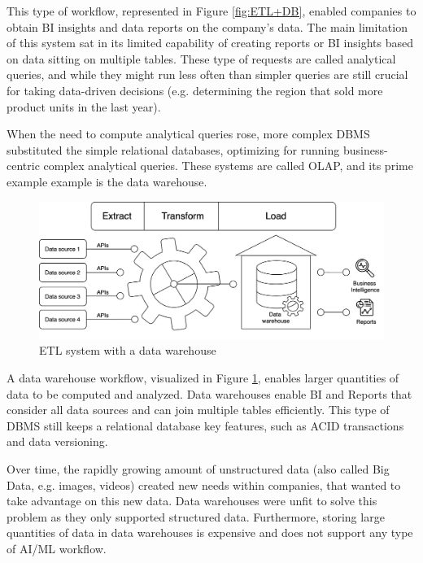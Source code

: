 This type of workflow, represented in Figure \ref{fig:ETL+DB}, enabled companies to obtain \gls{BI} insights and data reports on the company's data. The main limitation of this system sat in its limited capability of creating reports or \gls{BI} insights based on data sitting on multiple tables. These type of requests are called analytical queries, and while they might run less often than simpler queries are still crucial for taking data-driven decisions (e.g. determining the region that sold more product units in the last year).

When the need to compute analytical queries rose, more complex \gls{DBMS} substituted the simple relational databases, optimizing for running business-centric complex analytical queries. These systems are called \gls{OLAP}, and its prime example example is the data warehouse.

\begin{figure}[!ht]
    \begin{center}
      \includegraphics[width=\textwidth]{figures/2-background/DeltaLake_evolution-ETL+DW.png}
    \end{center}
    \caption{\gls{ETL} system with a data warehouse}
    \label{fig:ETL+DW}
\end{figure}

A data warehouse workflow, visualized in Figure \ref{fig:ETL+DW}, enables larger quantities of data to be computed and analyzed. Data warehouses enable \gls{BI} and Reports that consider all data sources and can join multiple tables efficiently. This type of \gls{DBMS} still keeps a relational database key features, such as \gls{ACID} transactions and data versioning.

Over time, the rapidly growing amount of unstructured data (also called Big Data, e.g. images, videos) created new needs within companies, that wanted to take advantage on this new data. Data warehouses were unfit to solve this problem as they only supported structured data. Furthermore, storing large quantities of data in data warehouses is expensive and does not support any type of \gls{AI}/\gls{ML} workflow.

